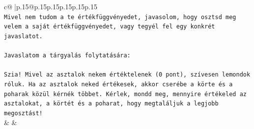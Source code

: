 \documentclass{article}
\begin{document}
{\begin{supertabular}{c@{$\;$}|p{.15\linewidth}@{}p{.15\linewidth}p{.15\linewidth}p{.15\linewidth}p{.15\linewidth}p{.15\linewidth}}
{{{\\ 
\texttt{Mivel nem tudom a te értékfüggvényedet, javasolom, hogy osztsd meg velem a saját értékfüggvényedet, vagy tegyél fel egy konkrét javaslatot.} \\
\\ 
\texttt{Javaslatom a tárgyalás folytatására:} \\
\\ 
\texttt{Szia! Mivel az asztalok nekem értéktelenek (0 pont), szívesen lemondok róluk. Ha az asztalok neked értékesek, akkor cserébe a körte és a poharak közül kérnék többet. Kérlek, mondd meg, mennyire értékeled az asztalokat, a körtét és a poharat, hogy megtaláljuk a legjobb megosztást!} \\
            }
        }
    }
    & & \\ \\


\end{supertabular}}
\end{document}
